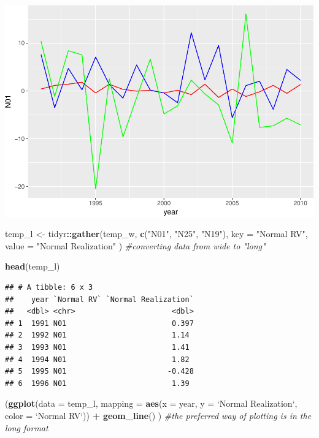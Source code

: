 \documentclass[11pt,]{article}
\newenvironment{Shaded}{\begin{snugshade}}{\end{snugshade}}
\newcommand{\KeywordTok}[1]{\textcolor[rgb]{0.13,0.29,0.53}{\textbf{#1}}}
\newcommand{\DataTypeTok}[1]{\textcolor[rgb]{0.13,0.29,0.53}{#1}}
\newcommand{\StringTok}[1]{\textcolor[rgb]{0.31,0.60,0.02}{#1}}
\newcommand{\CommentTok}[1]{\textcolor[rgb]{0.56,0.35,0.01}{\textit{#1}}}
\newcommand{\OperatorTok}[1]{\textcolor[rgb]{0.81,0.36,0.00}{\textbf{#1}}}
\newcommand{\NormalTok}[1]{#1}
\begin{document}
\includegraphics{Intro_graphics_files/figure-latex/wide_vs_long-1.pdf}

\begin{Shaded}
\begin{Highlighting}[]
\NormalTok{temp_l <-}\StringTok{ }\NormalTok{tidyr}\OperatorTok{::}\KeywordTok{gather}\NormalTok{(temp_w, }\KeywordTok{c}\NormalTok{(}\StringTok{"N01"}\NormalTok{, }\StringTok{"N25"}\NormalTok{, }\StringTok{"N19"}\NormalTok{), }
                        \DataTypeTok{key =} \StringTok{"Normal RV"}\NormalTok{, }
                        \DataTypeTok{value =} \StringTok{"Normal Realization"}
\NormalTok{                        ) }\CommentTok{#converting data from wide to "long"}

\KeywordTok{head}\NormalTok{(temp_l)}
\end{Highlighting}
\end{Shaded}

\begin{verbatim}
## # A tibble: 6 x 3
##    year `Normal RV` `Normal Realization`
##   <dbl> <chr>                      <dbl>
## 1  1991 N01                        0.397
## 2  1992 N01                        1.14 
## 3  1993 N01                        1.41 
## 4  1994 N01                        1.82 
## 5  1995 N01                       -0.428
## 6  1996 N01                        1.39
\end{verbatim}

\begin{Shaded}
\begin{Highlighting}[]
\NormalTok{(}\KeywordTok{ggplot}\NormalTok{(}\DataTypeTok{data =}\NormalTok{ temp_l,}
        \DataTypeTok{mapping =} \KeywordTok{aes}\NormalTok{(}\DataTypeTok{x =}\NormalTok{ year, }
                      \DataTypeTok{y =} \StringTok{`}\DataTypeTok{Normal Realization}\StringTok{`}\NormalTok{,}
                      \DataTypeTok{color =} \StringTok{`}\DataTypeTok{Normal RV}\StringTok{`}\NormalTok{)) }\OperatorTok{+}
\StringTok{    }\KeywordTok{geom_line}\NormalTok{()}
\NormalTok{  ) }\CommentTok{#the preferred way of plotting is in the long format}
\end{Highlighting}
\end{Shaded}
\end{document}
